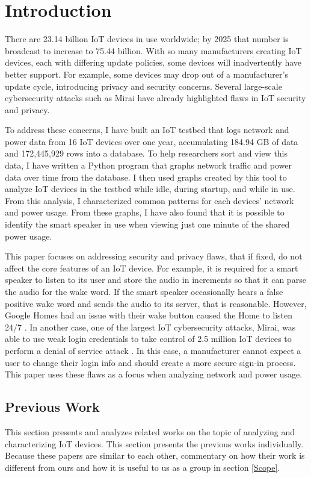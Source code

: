 \chapter{Introduction}
\label{Introduction}
There are 23.14 billion IoT devices in use worldwide; by 2025 that number is broadcast to increase to 75.44 billion\cite{statista_2016}. With so many manufacturers creating IoT devices, each with differing update policies, some devices will inadvertently have better support. For example, some devices may drop out of a manufacturer's update cycle, introducing privacy and security concerns. Several large-scale cybersecurity attacks such as Mirai \cite{iotforall_2017} have already highlighted flaws in IoT security and privacy.

To address these concerns, I have built an IoT testbed that logs network and power data from 16 IoT devices over one year, accumulating 184.94 GB of data and 172,445,929 rows into a database. To help researchers sort and view this data, I have written a Python program that graphs network traffic and power data over time from the database. I then used graphs created by this tool to analyze IoT devices in the testbed while idle, during startup, and while in use. From this analysis, I characterized common patterns for each devices' network and power usage. From these graphs, I have also found that it is possible to identify the smart speaker in use when viewing just one minute of the shared power usage.

This paper focuses on addressing security and privacy flaws, that if fixed, do not affect the core features of an IoT device. For example, it is required for a smart speaker to listen to its user and store the audio in increments so that it can parse the audio for the wake word. If the smart speaker occasionally hears a false positive wake word and sends the audio to its server, that is reasonable. However, Google Homes had an issue with their wake button caused the Home to listen 24/7 \cite{burke_2017}. In another case, one of the largest IoT cybersecurity attacks, Mirai, was able to use weak login credentials to take control of 2.5 million IoT devices to perform a denial of service attack \cite{whittaker_2017}. In this case, a manufacturer cannot expect a user to change their login info and should create a more secure sign-in process. This paper uses these flaws as a focus when analyzing network and power usage.

\section{Previous Work}
This section presents and analyzes related works on the topic of analyzing and characterizing IoT devices. This section presents the previous works individually. Because these papers are similar to each other, commentary on how their work is different from ours and how it is useful to us as a group in section \ref{Scope}.

